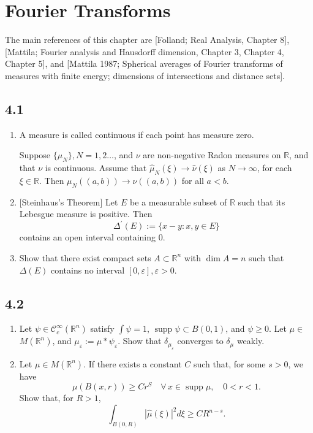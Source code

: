 \section{Fourier Transforms}

The main references of this chapter are [Folland; Real Analysis, Chapter 8], 
[Mattila; Fourier analysis and Hausdorff dimension, Chapter 3, Chapter 4, Chapter 5], 
and [Mattila 1987; Spherical averages of Fourier transforms of measures with finite energy; dimensions of intersections and distance sets].

\subsection*{4.1}
\begin{enumerate}
    \item A measure is called continuous if each point has measure zero.
    
    Suppose $\{\mu_{N}\}, N=1,2 \ldots$, and $\nu$ are non-negative Radon measures on $\mathbb{R}$, and that $\nu$ is continuous. 
    Assume that $\widehat{\mu}_N(\xi) \rightarrow \widehat{\nu}(\xi)$ as $N \rightarrow \infty$, for each $\xi \in \mathbb{R}$. 
    Then $\mu_{N}((a, b)) \rightarrow \nu((a, b))$ for all $a<b$.
    \item {[Steinhaus's Theorem]} Let $E$ be a measurable subset of $\mathbb{R}$ such that its Lebesgue measure is positive. Then
    $$\Delta^{\prime}(E):=\{x-y: x, y \in E\}$$contains an open interval containing $0$.
    \item Show that there exist compact sets $A \subset \mathbb{R}^{n}$ with $\dim A=n$ 
    such that $\Delta(E)$ contains no interval $[0, \varepsilon], \varepsilon>0$.
\end{enumerate}

\subsection*{4.2}
\begin{enumerate}
    \item Let $\psi \in \mathcal{C}_{c}^{\infty}(\mathbb{R}^{n})$ satisfy $\int \psi=1$, 
    $\operatorname{supp}\psi \subset B(0,1)$, and $\psi \geq 0$. 
    Let $\mu \in$ $M(\mathbb{R}^{n})$, and $\mu_{\varepsilon}:=\mu * \psi_{\varepsilon}$. 
    Show that $\delta_{\mu_{\varepsilon}}$ converges to $\delta_{\mu}$ weakly.
    \item Let $\mu \in M(\mathbb{R}^{n})$. If there exists a constant $C$ such that, for some $s>0$, we have
    $$\mu(B(x, r)) \geq C r^{S} \quad \forall \, x \in \operatorname{supp} \mu, \quad 0<r<1.$$
    Show that, for $R>1$,
    $$\int_{B(0, R)}|\widehat{\mu}(\xi)|^{2} d \xi \geq C R^{n-s}.$$
\end{enumerate}

